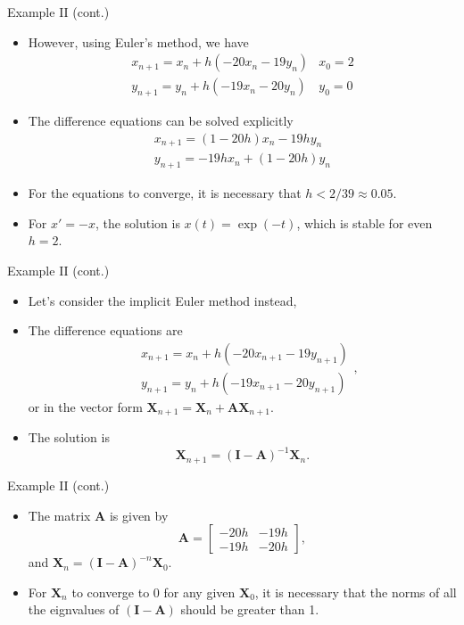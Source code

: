 \documentclass{beamer}
\begin{document}
\begin{frame}{Example II (cont.)}
    \begin{itemize}
        \item However, using Euler's method, we have
        $$
\begin{array}{ll}
x_{n+1}=x_n+h\left(-20 x_n-19 y_n\right) & x_0=2 \\
y_{n+1}=y_n+h\left(-19 x_n-20 y_n\right) & y_0=0
\end{array}
$$
\item The difference equations can be solved explicitly
\[
\begin{array}{l}
x_{n+1}=\left(1-20 h\right) x_n-19 h y_n \\
y_{n+1}=-19 h x_n+\left(1-20 h\right) y_n
\end{array}
\]
\item For the equations to converge, it is necessary that $h< 2/39 \approx 0.05$.
\item For $x'=-x$, the solution is $x(t)=\exp(-t)$, which is stable for even $h=2$.
    \end{itemize}

\end{frame}
\begin{frame}{Example II (cont.)}
    \begin{itemize}
        \item Let's consider the implicit Euler method instead,
        \item The difference equations are
        $$
\begin{aligned}
& x_{n+1}=x_n+h\left(-20 x_{n+1}-19 y_{n+1}\right) \\
& y_{n+1}=y_n+h\left(-19 x_{n+1}-20 y_{n+1}\right)
\end{aligned},
$$
or in the vector form $\mathbf{X}_{n+1}=\mathbf{X}_n+\mathbf{A} \mathbf{X}_{n+1}$.

\item The solution is
\[
\mathbf{X}_{n+1}=\left(\mathbf{I}-\mathbf{A}\right)^{-1} \mathbf{X}_n.
\]

   
    \end{itemize}
\end{frame}

\begin{frame}{Example II (cont.)}
    
   
\begin{itemize}
     \item The matrix $\mathbf{A}$ is given by
        \[  
        \mathbf{A}=\left[\begin{array}{cc}
        -20h & -19h \\
        -19h & -20h
        \end{array}\right],
        \]
        and $\mathbf{X}_{n}=\left(\mathbf{I}-\mathbf{A}\right)^{-n} \mathbf{X}_0$.
         
        
        \item For $\mathbf{X}_n$ to converge to 0 for any given $\mathbf{X}_0$, it is necessary that the norms of all the eignvalues of $\left(\mathbf{I}-\mathbf{A}\right)$ 
        should be greater than 1. 

    \end{itemize}
\end{frame}
\end{document}
